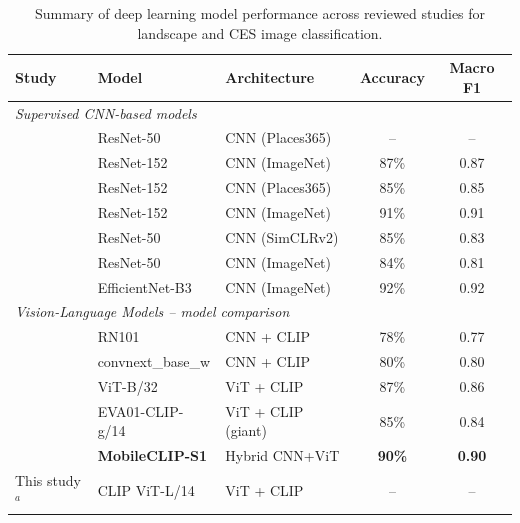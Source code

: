 \documentclass[hidelinks, 11pt]{article}
\begin{document}
\begin{table}[ht]
\centering
\caption{Summary of deep learning model performance across reviewed studies 
for landscape and CES image classification.}
\label{tab:model_comparison}
\renewcommand{\arraystretch}{1.3}
\begin{tabular}{lllcc}
\toprule
\textbf{Study} & \textbf{Model} & \textbf{Architecture} & \textbf{Accuracy} & \textbf{Macro F1} \\
\midrule
\multicolumn{5}{l}{\textit{Supervised CNN-based models}} \\
\midrule
\citet{havinga_social_2021}
    & ResNet-50          & CNN (Places365)    & --    & --   \\
\citet{cardoso_classifying_2022}
    & ResNet-152         & CNN (ImageNet)     & 87\%  & 0.87 \\
\citet{lingua_valuing_2022}
    & ResNet-152         & CNN (Places365)    & 85\%  & 0.85 \\
\citet{comalada_modelling_2025}
    & ResNet-152         & CNN (ImageNet)     & 91\%  & 0.91 \\
\citet{xu_revealing_2025}
    & ResNet-50          & CNN (SimCLRv2)     & 85\%  & 0.83 \\
\citet{you_mapping_2026}
    & ResNet-50          & CNN (ImageNet)     & 84\%  & 0.81 \\
\citet{chen_using_2025}
    & EfficientNet-B3    & CNN (ImageNet)     & 92\%  & 0.92 \\
\midrule
\multicolumn{5}{l}{\textit{Vision-Language Models -- model comparison 
\citet{liao_mapping_2025}}} \\
\midrule
\citet{liao_mapping_2025}
    & RN101              & CNN + CLIP         & 78\%  & 0.77 \\
\citet{liao_mapping_2025}
    & convnext\_base\_w  & CNN + CLIP         & 80\%  & 0.80 \\
\citet{liao_mapping_2025}
    & ViT-B/32           & ViT + CLIP         & 87\%  & 0.86 \\
\citet{liao_mapping_2025}
    & EVA01-CLIP-g/14    & ViT + CLIP (giant) & 85\%  & 0.84 \\
\citet{liao_mapping_2025}
    & \textbf{MobileCLIP-S1} & Hybrid CNN+ViT & \textbf{90\%} & \textbf{0.90} \\
This study$^{a}$
    & CLIP ViT-L/14      & ViT + CLIP         & --    & --   \\
\bottomrule
\end{tabular}
\begin{minipage}{\textwidth}
\bigskip\raggedright\small

\end{minipage}
\end{table}
\end{document}
